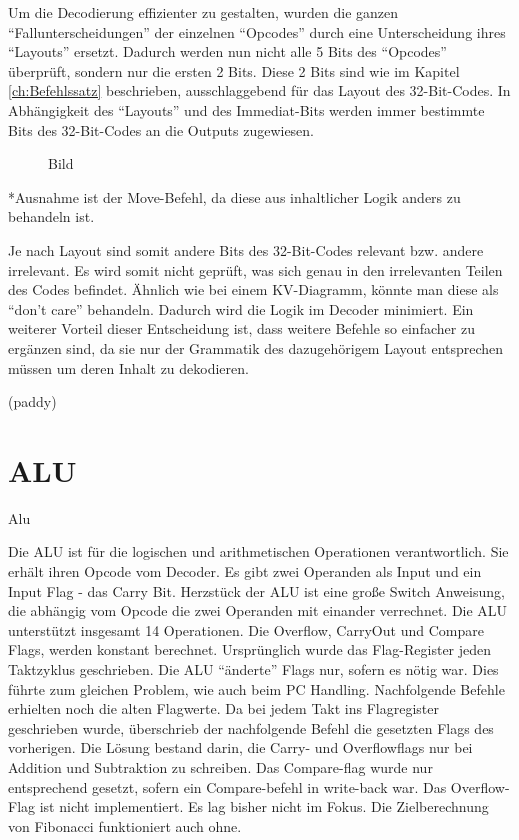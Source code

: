 \documentclass[paper=a4,fontsize=12pt,twocolumn]{scrreprt}
\begin{document}
Um die Decodierung effizienter zu gestalten, wurden die ganzen \enquote{Fallunterscheidungen} der einzelnen \enquote{Opcodes} durch eine Unterscheidung ihres \enquote{Layouts} ersetzt.
Dadurch werden nun nicht alle 5 Bits des \enquote{Opcodes} überprüft, sondern nur die ersten 2 Bits.
Diese 2 Bits sind wie im Kapitel \ref{ch:Befehlssatz} beschrieben, ausschlaggebend für das Layout des 32-Bit-Codes.
In Abhängigkeit des \enquote{Layouts} und des Immediat-Bits werden immer bestimmte Bits des 32-Bit-Codes an die Outputs zugewiesen.


\begin{figure}[h]
\centering
\caption{Bild}
\end{figure}

*Ausnahme ist der Move-Befehl, da diese aus inhaltlicher Logik anders zu behandeln ist.

Je nach Layout sind somit andere Bits des 32-Bit-Codes relevant bzw. andere irrelevant. Es wird somit nicht geprüft, was sich genau in den irrelevanten Teilen des Codes befindet. Ähnlich wie bei einem KV-Diagramm, könnte man diese als  \enquote{don't care} behandeln. Dadurch wird die Logik im Decoder minimiert. 
Ein weiterer Vorteil dieser Entscheidung ist, dass weitere Befehle so einfacher zu ergänzen sind, da sie nur der Grammatik des dazugehörigem Layout entsprechen müssen um deren Inhalt zu dekodieren.  


(paddy)

\section{ALU}

Alu

Die ALU ist für die logischen und arithmetischen Operationen verantwortlich.
Sie erhält ihren Opcode vom Decoder.
Es gibt zwei Operanden als Input und ein Input Flag - das Carry Bit.
Herzstück der ALU ist eine große Switch Anweisung, die abhängig vom Opcode die zwei Operanden mit einander verrechnet.
Die ALU unterstützt insgesamt 14 Operationen. 
Die Overflow, CarryOut und Compare Flags, werden konstant berechnet.
Ursprünglich wurde das Flag-Register jeden Taktzyklus geschrieben.
Die ALU \enquote{änderte} Flags nur, sofern es nötig war.
Dies führte zum gleichen Problem, wie auch beim PC Handling.
Nachfolgende Befehle erhielten noch die alten Flagwerte.
Da bei jedem Takt ins Flagregister geschrieben wurde, überschrieb der nachfolgende Befehl die gesetzten Flags des vorherigen.
Die Lösung bestand darin, die Carry- und Overflowflags nur bei Addition und Subtraktion zu schreiben.
Das Compare-flag wurde nur entsprechend gesetzt, sofern ein Compare-befehl in write-back war.
Das Overflow-Flag ist nicht implementiert.
Es lag bisher nicht im Fokus.
Die Zielberechnung von Fibonacci funktioniert auch ohne.
\end{document}
